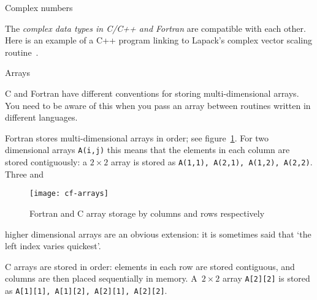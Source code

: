 
 {Complex numbers}

The \emph{complex data types in C/C++ and Fortran}%
 are compatible with each
other. Here is an example of a C++ program linking to Lapack's complex
vector scaling routine~.
%

 {Arrays}
\label{sec:CFarrays}

C and Fortran have different conventions for storing multi-dimensional
arrays. You need to be aware of this when you pass an array between
routines written in different languages. 

Fortran stores multi-dimensional arrays in 
order; see figure~\ref{fig:cf-arrays}.
For two dimensional arrays \texttt{A(i,j)} this means that
the elements in each column are stored contiguously: a $2\times2$
array is stored as \texttt{A(1,1), A(2,1), A(1,2), A(2,2)}. Three and
\begin{figure}[ht]
  \texttt{[image: cf-arrays]}
  \caption{Fortran and C array storage by columns and rows respectively}
  \label{fig:cf-arrays}
\end{figure}
higher dimensional arrays are an obvious extension: it is sometimes
said that `the left index varies quickest'.

C arrays are stored in  order: elements in each
row are stored contiguous, and columns are then placed sequentially in
memory. A~$2\times2$ array \texttt{A[2][2]} is stored as
\texttt{A[1][1], A[1][2], A[2][1], A[2][2]}. 

